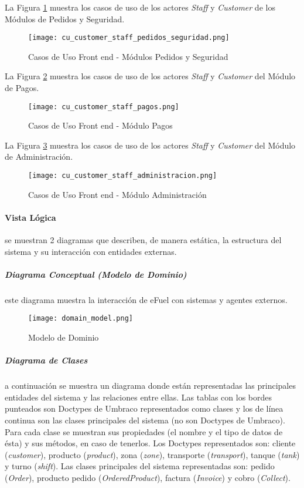 \newpage
La Figura \ref{fig:cu_customer_staff_pedidos} muestra los casos de uso de los actores \textit{Staff} y \textit{Customer} de los Módulos de Pedidos y Seguridad.
\begin{figure}[H]
    \centering
    \texttt{[image: cu\_customer\_staff\_pedidos\_seguridad.png]}
    \caption{Casos de Uso Front end - Módulos Pedidos y Seguridad}
    \label{fig:cu_customer_staff_pedidos}
\end{figure}
\vspace*{\fill}

\newpage
La Figura \ref{fig:cu_customer_staff_pagos} muestra los casos de uso de los actores \textit{Staff} y \textit{Customer} del Módulo de Pagos.
\begin{figure}[H]
    \centering
    \texttt{[image: cu\_customer\_staff\_pagos.png]}
    \caption{Casos de Uso Front end - Módulo Pagos}
    \label{fig:cu_customer_staff_pagos}
\end{figure}
\vspace*{\fill}

\newpage
La Figura \ref{fig:cu_customer_staff_administracion} muestra los casos de uso de los actores \textit{Staff} y \textit{Customer} del Módulo de Administración.
\begin{figure}[H]
    \centering
    \texttt{[image: cu\_customer\_staff\_administracion.png]}
    \caption{Casos de Uso Front end - Módulo Administración}
    \label{fig:cu_customer_staff_administracion}
\end{figure}

\newpage
\paragraph{Vista Lógica} se muestran 2 diagramas que describen, de manera estática, la estructura del sistema y su interacción con entidades externas.

\subparagraph*{Diagrama Conceptual (Modelo de Dominio)} este diagrama muestra la interacción de eFuel con sistemas y agentes externos.
\begin{figure}[H]
    \texttt{[image: domain\_model.png]}
    \caption{Modelo de Dominio}
    \label{fig:domain_model}
    \centering
\end{figure}

\subparagraph*{Diagrama de Clases} a continuación se muestra un diagrama donde están representadas las principales entidades del sistema y las relaciones entre ellas. Las tablas con los bordes punteados son Doctypes de Umbraco representados como clases y los de línea continua son las clases principales del sistema (no son Doctypes de Umbraco). Para cada clase se muestran sus propiedades (el nombre y el tipo de datos de ésta) y sus métodos, en caso de tenerlos. Los Doctypes representados son: cliente (\textit{customer}), producto (\textit{product}), zona (\textit{zone}), transporte (\textit{transport}), tanque (\textit{tank}) y turno (\textit{shift}). Las clases principales del sistema representadas son: pedido (\textit{Order}), producto pedido (\textit{OrderedProduct}), factura (\textit{Invoice}) y cobro (\textit{Collect}).

